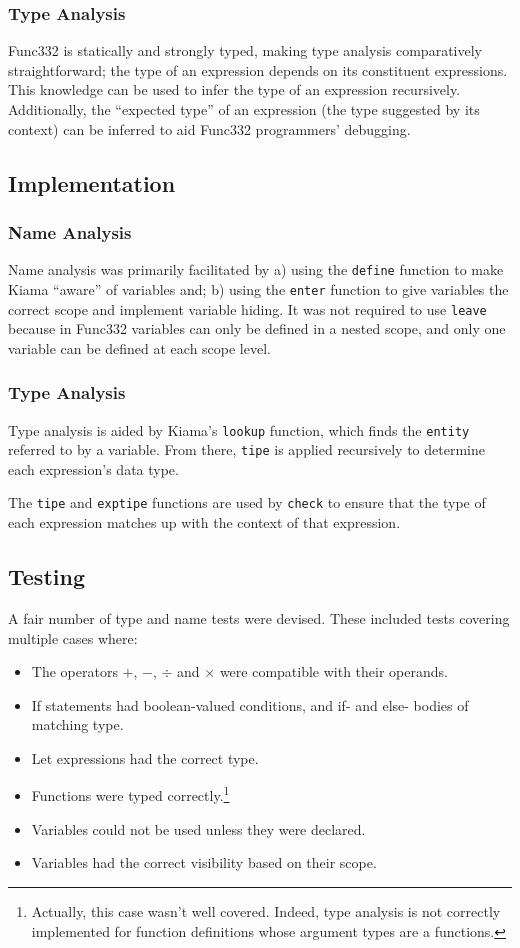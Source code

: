 \documentclass[a4paper]{article}
\begin{document}
	\subsubsection{Type Analysis}
	Func332 is statically and strongly typed, making type analysis comparatively straightforward; the type of an expression depends on its constituent expressions. This knowledge can be used to infer the type of an expression recursively. Additionally, the ``expected type'' of an expression (the type suggested by its context) can be inferred to aid Func332 programmers' debugging.
	
	\subsection{Implementation}
	\subsubsection{Name Analysis}
	Name analysis was primarily facilitated by a) using the \verb=define= function to make Kiama ``aware'' of variables and; b) using the \verb=enter= function to give variables the correct scope and implement variable hiding. It was not required to use \verb=leave= because in Func332 variables can only be defined in a nested scope, and only one variable can be defined at each scope level.
	
	\subsubsection{Type Analysis}
	Type analysis is aided by Kiama's \verb=lookup= function, which finds the \verb=entity= referred to by a variable. From there, \verb=tipe= is applied recursively to determine each expression's data type.
	
	The \verb=tipe= and \verb=exptipe= functions are used by \verb=check= to ensure that the type of each expression matches up with the context of that expression.
	
	\subsection{Testing}
	A fair number of type and name tests were devised. These included tests covering multiple cases where:
	\begin{itemize}
		\item The operators $+$, $-$, $\div$ and $\times$ were compatible with their operands.
		\item If statements had boolean-valued conditions, and if- and else- bodies of matching type.
		\item Let expressions had the correct type.
		\item Functions were typed correctly.\footnote{Actually, this case wasn't well covered. Indeed, type analysis is not correctly implemented for function definitions whose argument types are a functions.}
		\item Variables could not be used unless they were declared.
		\item Variables had the correct visibility based on their scope.
	\end{itemize}
\end{document}
